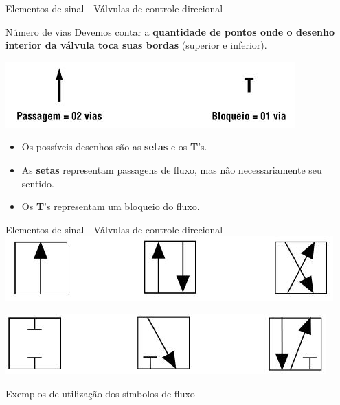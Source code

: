 \begin{frame}{Elementos de sinal - Válvulas de controle direcional}
	\begin{block}{Número de vias}
		Devemos contar a \textbf{quantidade de pontos onde o desenho interior da válvula toca suas bordas} (superior e inferior).
	\end{block}
	
	\medskip
	
	\centering
	\includegraphics[width=0.7\linewidth]{Figuras/Ch14/fig05}
	
	\medskip
	
	\begin{block}{}
		\begin{itemize}
			\item Os possíveis desenhos são as \textbf{setas} e os \textbf{T}'s.
			\item As \textbf{setas} representam passagens de fluxo, mas não necessariamente seu sentido.
			\item Os \textbf{T}'s representam um bloqueio do fluxo.
		\end{itemize}
	\end{block}
\end{frame}


\begin{frame}{Elementos de sinal - Válvulas de controle direcional}
	\centering
	\includegraphics[width=0.87\linewidth]{Figuras/Ch14/fig06}
	
	\medskip
	
	\includegraphics[width=0.85\linewidth]{Figuras/Ch14/fig07}
	
	\medskip
	
	Exemplos de utilização dos símbolos de fluxo
\end{frame}


